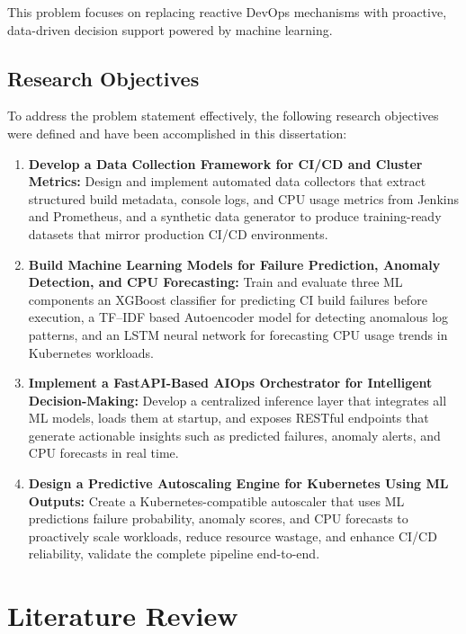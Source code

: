 \documentclass[12pt]{report}
\begin{document}
This problem focuses on replacing reactive DevOps mechanisms with proactive, data-driven decision support powered by machine learning.

\section{Research Objectives}
To address the problem statement effectively, the following research objectives were defined and have been accomplished in this dissertation:
\begin{enumerate}
    \item \textbf{Develop a Data Collection Framework for CI/CD and Cluster Metrics:} Design and implement automated data collectors that extract structured build metadata, console logs, and CPU usage metrics from Jenkins and Prometheus, and a synthetic data generator to produce training-ready datasets that mirror production CI/CD environments.

    \item \textbf{Build Machine Learning Models for Failure Prediction, Anomaly Detection, and CPU Forecasting:} Train and evaluate three ML components an XGBoost classifier for predicting CI build failures before execution, a TF--IDF based Autoencoder model for detecting anomalous log patterns, and an LSTM neural network for forecasting CPU usage trends in Kubernetes workloads.

    \item \textbf{Implement a FastAPI-Based AIOps Orchestrator for Intelligent Decision-Making:} Develop a centralized inference layer that integrates all ML models, loads them at startup, and exposes RESTful endpoints that generate actionable insights such as predicted failures, anomaly alerts, and CPU forecasts in real time.

    \item \textbf{Design a Predictive Autoscaling Engine for Kubernetes Using ML Outputs:} Create a Kubernetes-compatible autoscaler that uses ML predictions failure probability, anomaly scores, and CPU forecasts to proactively scale workloads, reduce resource wastage, and enhance CI/CD reliability, validate the complete pipeline end-to-end.
\end{enumerate}

\clearpage
\chapter{Literature Review}
\end{document}

